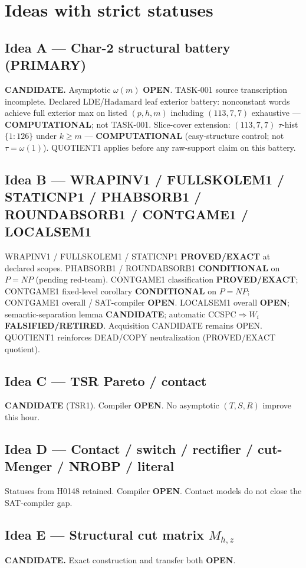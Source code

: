 \documentclass[11pt]{article}
\begin{document}
\section*{Ideas with strict statuses}
\subsection*{Idea A --- Char-2 structural battery (PRIMARY)}
\textbf{CANDIDATE.} Asymptotic $\omega(m)$ \textbf{OPEN}. TASK-001 source transcription incomplete.
Declared LDE/Hadamard leaf exterior battery: nonconstant words achieve full exterior max on
listed $(p,h,m)$ including $(113,7,7)$ exhaustive --- \textbf{COMPUTATIONAL}; not TASK-001.
Slice-cover extension: $(113,7,7)$ $\tau$-hist $\{1{:}126\}$ under $k{\ge}m$ ---
\textbf{COMPUTATIONAL} (easy-structure control; not $\tau=\omega(1)$).
QUOTIENT1 applies before any raw-support claim on this battery.

\subsection*{Idea B --- WRAPINV1 / FULLSKOLEM1 / STATICNP1 / PHABSORB1 / ROUNDABSORB1 / CONTGAME1 / LOCALSEM1}
WRAPINV1 / FULLSKOLEM1 / STATICNP1 \textbf{PROVED/EXACT} at declared scopes.
PHABSORB1 / ROUNDABSORB1 \textbf{CONDITIONAL} on $P=NP$ (pending red-team).
CONTGAME1 classification \textbf{PROVED/EXACT}; CONTGAME1 fixed-level corollary
\textbf{CONDITIONAL} on $P=NP$; CONTGAME1 overall / SAT-compiler \textbf{OPEN}.
LOCALSEM1 overall \textbf{OPEN}; semantic-separation lemma \textbf{CANDIDATE};
automatic CCSPC$\Rightarrow W_i$ \textbf{FALSIFIED/RETIRED}.
Acquisition CANDIDATE remains OPEN.
QUOTIENT1 reinforces DEAD/COPY neutralization (PROVED/EXACT quotient).

\subsection*{Idea C --- TSR Pareto / contact}
\textbf{CANDIDATE} (TSR1). Compiler \textbf{OPEN}. No asymptotic $(T,S,R)$ improve this hour.

\subsection*{Idea D --- Contact / switch / rectifier / cut-Menger / NROBP / literal}
Statuses from H0148 retained. Compiler \textbf{OPEN}. Contact models do not close the SAT-compiler gap.

\subsection*{Idea E --- Structural cut matrix $M_{h,z}$}
\textbf{CANDIDATE.} Exact construction and transfer both \textbf{OPEN}.
\end{document}
